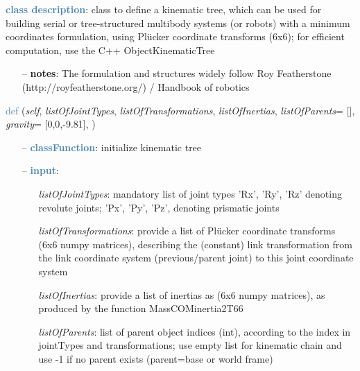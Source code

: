 \begin{itemize}[leftmargin=1.4cm]
\begin{itemize}[leftmargin=1.4cm]
\begin{itemize}[leftmargin=0.5cm]
\begin{itemize}[leftmargin=1.4cm]
\begin{itemize}[leftmargin=1.4cm]
\begin{itemize}[leftmargin=0.5cm]
\begin{itemize}[leftmargin=1.4cm]
\begin{itemize}[leftmargin=0.5cm]
\begin{itemize}[leftmargin=1.4cm]
\begin{itemize}[leftmargin=1.4cm]
\begin{itemize}[leftmargin=1.4cm]
%
\noindent\textcolor{steelblue}{{\bf class description}}:  class to define a kinematic tree, which can be used for building serial or tree-structured multibody systems
         (or robots) with a minimum coordinates formulation, using Pl\"ucker coordinate transforms (6x6); for efficient computation, use the C++ ObjectKinematicTree
\setlength{\itemindent}{0.7cm}
\begin{itemize}[leftmargin=0.7cm]
  \item[--]  {\bf notes}: The formulation and structures widely follow Roy Featherstone (http://royfeatherstone.org/) / Handbook of robotics \cite{Siciliano2016}\vspace{24pt}\end{itemize}
%
\begin{flushleft}
\noindent \textcolor{steelblue}{def {\bf {}}}\label{sec:kinematicTree:KinematicTree66:__init__}
({\it self}, {\it listOfJointTypes}, {\it listOfTransformations}, {\it listOfInertias}, {\it listOfParents}= [], {\it gravity}= [0,0,-9.81], {\it })
\end{flushleft}
\setlength{\itemindent}{0.7cm}
\begin{itemize}[leftmargin=0.7cm]
  \item[--]  \textcolor{steelblue}{\bf classFunction}: initialize kinematic tree  \item[--]  \textcolor{steelblue}{\bf input}: \vspace{-6pt}
  \begin{itemize}[leftmargin=1.2cm]
\setlength{\itemindent}{-0.7cm}
    \item[] {\it listOfJointTypes}: mandatory list of joint types 'Rx', 'Ry', 'Rz' denoting revolute joints; 'Px', 'Py', 'Pz', denoting prismatic joints
    \item[] {\it   listOfTransformations}: provide a list of Pl\"ucker coordinate transforms (6x6 numpy matrices), describing the (constant) link transformation from the link coordinate system (previous/parent joint) to this joint coordinate system
    \item[] {\it   listOfInertias}: provide a list of inertias as (6x6 numpy matrices), as produced by the function MassCOMinertia2T66
    \item[] {\it   listOfParents}: list of parent object indices (int), according to the index in jointTypes and transformations; use empty list for kinematic chain and use -1 if no parent exists (parent=base or world frame)

\end{itemize}
\end{itemize}
\end{itemize}
\end{itemize}
\end{itemize}
\end{itemize}
\end{itemize}
\end{itemize}
\end{itemize}
\end{itemize}
\end{itemize}
\end{itemize}
\end{itemize}
